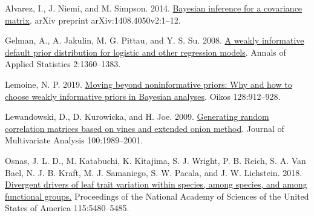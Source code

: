 \documentclass[
  12pt,
  letterpaper,
  DIV=11,
  numbers=noendperiod]{scrartcl}
\newlength{\cslhangindent}
\newlength{\cslentryspacingunit} %
\newenvironment{CSLReferences}[2] %
 {%
  \setlength{\parindent}{0pt}
  \ifodd #1
  \let\oldpar\par
  \def\par{\hangindent=\cslhangindent\oldpar}
  \fi
  \setlength{\parskip}{#2\cslentryspacingunit}
 }%
 {}
\begin{document}
\hypertarget{refs}{}
\begin{CSLReferences}{1}{0}
\leavevmode{}%
Alvarez, I., J. Niemi, and M. Simpson. 2014.
\href{https://doi.org/10.1214/aos/1176348885}{Bayesian inference for a
covariance matrix}. arXiv preprint arXiv:1408.4050v2:1--12.

\leavevmode{}%
Gelman, A., A. Jakulin, M. G. Pittau, and Y. S. Su. 2008.
\href{https://doi.org/10.1214/08-AOAS191}{A weakly informative default
prior distribution for logistic and other regression models}. Annals of
Applied Statistics 2:1360--1383.

\leavevmode{}%
Lemoine, N. P. 2019. \href{https://doi.org/10.1111/oik.05985}{Moving
beyond noninformative priors: Why and how to choose weakly informative
priors in {Bayesian} analyses}. Oikos 128:912--928.

\leavevmode{}%
Lewandowski, D., D. Kurowicka, and H. Joe. 2009.
\href{https://doi.org/10.1016/j.jmva.2009.04.008}{Generating random
correlation matrices based on vines and extended onion method}. Journal
of Multivariate Analysis 100:1989--2001.

\leavevmode{}%
Osnas, J. L. D., M. Katabuchi, K. Kitajima, S. J. Wright, P. B. Reich,
S. A. Van Bael, N. J. B. Kraft, M. J. Samaniego, S. W. Pacala, and J. W.
Lichstein. 2018.
\href{https://doi.org/10.1073/pnas.1803989115}{Divergent drivers of leaf
trait variation within species, among species, and among functional
groups.} Proceedings of the National Academy of Sciences of the United
States of America 115:5480--5485.

\end{CSLReferences}
\end{document}
